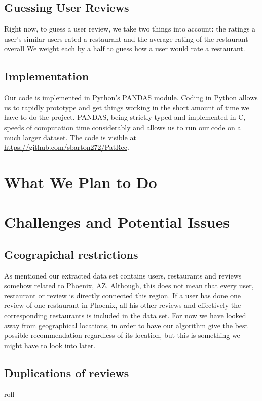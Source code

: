 \documentclass[10pt,twocolumn,letterpaper]{article}
\begin{document}
\subsection{Guessing User Reviews}
Right now, to guess a user review, we take two things into account: the ratings a user's similar users rated a restaurant and the average rating of the restaurant overall We weight each by a half to guess how a user would rate a restaurant.
\subsection{Implementation}
Our code is implemented in Python's PANDAS module. Coding in Python allows us to rapidly prototype and get things working in the short amount of time we have to do the project. PANDAS, being strictly typed and implemented in C, speeds of computation time considerably and allows us to run our code on a much larger dataset. The code is visible at \url{https://github.com/sbarton272/PatRec}.

\section{What We Plan to Do}

\section{Challenges and Potential Issues}
\subsection{Geograpichal restrictions}
As mentioned our extracted data set contains users, restaurants and reviews somehow related to Phoenix, AZ. Although, this does not mean that every user, restaurant or review is directly connected this region. If a user has done one review of one restaurant in Phoenix, all his other reviews and effectively the corresponding restaurants is included in the data set. For now we have looked away from geographical locations, in order to have our algorithm give the best possible recommendation regardless of its location, but this is something we might have to look into later.

\subsection{Duplications of reviews}
rofl

{\small

}
\end{document}
